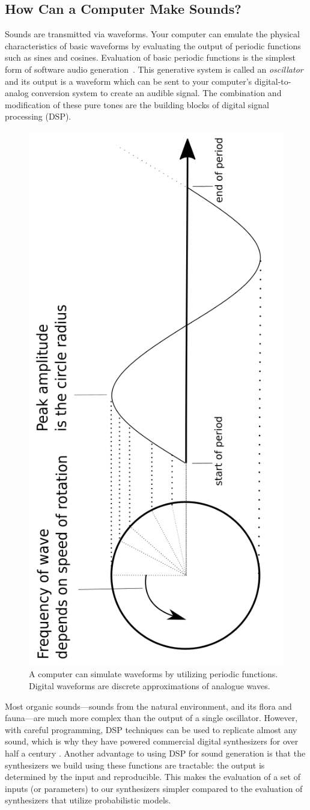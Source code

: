 \documentclass[runningheads,a4paper]{llncs}
\begin{document}
\subsection{How Can a Computer Make Sounds?}
Sounds are transmitted via waveforms. Your computer can emulate the physical characteristics of basic waveforms by evaluating the output of periodic functions such as sines and cosines. Evaluation of basic periodic functions is the simplest form of software audio generation~\cite{mitchell2009basicsynthChap5}.
This generative system is called an \textit{oscillator} and its output is a waveform which can be sent to your computer's digital-to-analog conversion system to create an audible signal. The combination and modification of these pure tones are the building blocks of digital signal processing (DSP).

\begin{figure}[h]
\label{fig_example_sine}
\centering
\includegraphics[width=0.45\linewidth,angle =-90 ]{images/periodic_function.png}
\caption{A computer can simulate waveforms by utilizing periodic functions. Digital waveforms are discrete approximations of analogue waves. \cite{mitchell2009basicsynthChap5} }
\end{figure}


 Most organic sounds---sounds from the natural environment, and its flora and fauna---are much more complex than the output of a single oscillator. However, with careful programming, DSP techniques can be used to replicate almost any sound, which is why they have powered commercial digital synthesizers for over half a century \cite{jenkins2019analog}. Another advantage to using DSP for sound generation is that the synthesizers we build using these functions are tractable: the output is determined by the input and reproducible. This makes the evaluation of a set of inputs (or parameters) to our synthesizers  simpler compared to the evaluation of synthesizers that utilize probabilistic models.
 
\end{document}

